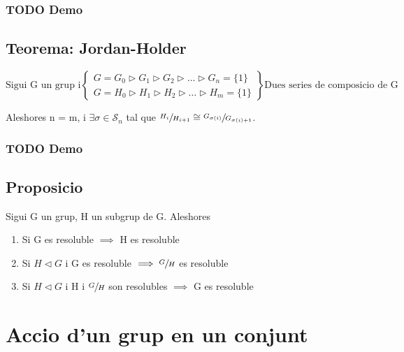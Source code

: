 \documentclass[11pt]{article}
\begin{document}
\subsubsection{{\bfseries\sffamily TODO} Demo}
\label{sec:org959dffc}

\subsection{Teorema: Jordan-Holder}
\label{sec:org85b1248}
\begin{displaymath}
    \text{Sigui G un grup i}
               \left\{\begin{array}{ll}
G = G_0 \vartriangleright G_1 \vartriangleright G_2 \vartriangleright \ldots \vartriangleright G_n = \{1\} \\
G = H_0 \vartriangleright H_1 \vartriangleright H_2 \vartriangleright \ldots \vartriangleright H_m = \{1\}
                \end{array}
\right\rbrace
              \text{Dues series de composicio de G}
\end{displaymath}

Aleshores n = m, i \(\exists \sigma \in \mathcal{S}_n\) tal que \(\sfrac{H_i}{H_{i+1}} \cong \sfrac{G_{\sigma(i)}}{G_{\sigma(i)+1}}\).

\subsubsection{{\bfseries\sffamily TODO} Demo}
\label{sec:orgd877252}

\subsection{Proposicio}
\label{sec:orga5c6a63}
Sigui G un grup, H un subgrup de G. Aleshores
\begin{enumerate}
\item Si G es resoluble \(\implies\) H es resoluble
\item Si \(H \vartriangleleft G\) i G es resoluble \(\implies \sfrac{G}{H}\) es resoluble
\item Si \(H \vartriangleleft G\) i H i \(\sfrac{G}{H}\) son resolubles \(\implies\) G es resoluble
\end{enumerate}

\section{Accio d'un grup en un conjunt}
\label{sec:orgf9bbb9b}
\end{document}
